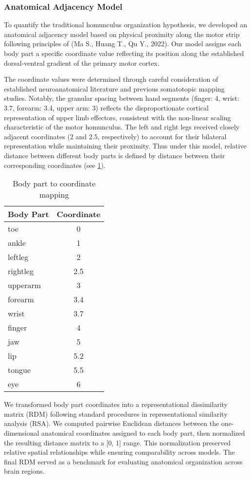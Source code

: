 \documentclass{article}
\begin{document}
\subsubsection{Anatomical Adjacency Model}
To quantify the traditional homunculus organization hypothesis, we developed an anatomical adjacency model based on physical proximity along the motor strip following principles of (Ma S., Huang T., Qu Y., 2022). Our model assigns each body part a specific coordinate value reflecting its position along the established dorsal-ventral gradient of the primary motor cortex.

The coordinate values were determined through careful consideration of established neuroanatomical literature and previous somatotopic mapping studies. Notably, the granular spacing between hand segments (finger: 4, wrist: 3.7, forearm: 3.4, upper arm: 3) reflects the disproportionate cortical representation of upper limb effectors, consistent with the non-linear scaling characteristic of the motor homunculus. The left and right legs received closely adjacent coordinates (2 and 2.5, respectively) to account for their bilateral representation while maintaining their proximity. Thus under this model, relative distance between different body parts is defined by distance between their corresponding coordinates (see \ref{tab:coords}).
\begin{table}[h]
\centering
\begin{tabular}{|l|c|}
\hline
\textbf{Body Part} & \textbf{Coordinate} \\
\hline
toe & 0 \\
ankle & 1 \\
leftleg & 2 \\
rightleg & 2.5 \\
upperarm & 3 \\
forearm & 3.4 \\
wrist & 3.7 \\
finger & 4 \\
jaw & 5 \\
lip & 5.2 \\
tongue & 5.5 \\
eye & 6 \\
\hline
\end{tabular}
\caption{Body part to coordinate mapping}
\label{tab:coords}
\end{table}

We transformed body part coordinates into a representational dissimilarity matrix (RDM) following standard procedures in representational similarity analysis (RSA). We computed pairwise Euclidean distances between the one-dimensional anatomical coordinates assigned to each body part, then normalized the resulting distance matrix to a [0, 1] range. This normalization preserved relative spatial relationships while ensuring comparability across models. The final RDM served as a benchmark for evaluating anatomical organization across brain regions.
\end{document}
